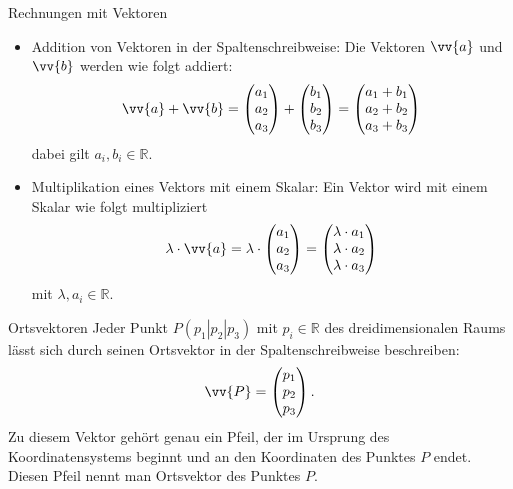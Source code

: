 \begin{bem}{Rechnungen mit Vektoren}{}
\begin{itemize}
    \item Addition von Vektoren in der Spaltenschreibweise: Die Vektoren $\vv{a}$ und $\vv{b}$ werden wie folgt addiert: $$\vv{a} + \vv{b} = \begin{pmatrix} a_1 \\ a_2 \\a_3 \end{pmatrix} + \begin{pmatrix} b_1 \\ b_2 \\b_3 \end{pmatrix} = \begin{pmatrix} a_1 + b_1 \\ a_2 + b_2 \\a_3 + b_3 \end{pmatrix}$$ dabei gilt $a_i, b_i \in \mathds{R}$.
    \item Multiplikation eines Vektors mit einem Skalar: Ein Vektor wird mit einem Skalar wie folgt multipliziert $$\lambda \cdot \vv{a} = \lambda \cdot \begin{pmatrix} a_1 \\ a_2 \\a_3 \end{pmatrix} = \begin{pmatrix} \lambda \cdot a_1 \\ \lambda \cdot a_2 \\\lambda \cdot a_3 \end{pmatrix}$$ mit $\lambda , a_i \in \mathds{R}$.
\end{itemize}
\end{bem}
\begin{satz}{Ortsvektoren}{}
Jeder Punkt $P(p_1|p_2|p_3)$ mit $p_i \in \mathds{R}$ des dreidimensionalen Raums lässt sich durch seinen Ortsvektor in der Spaltenschreibweise beschreiben:
$$\vv{P} = \begin{pmatrix} p_1 \\ p_2 \\p_3 \end{pmatrix}.$$ 
Zu diesem Vektor gehört genau ein Pfeil, der im Ursprung des Koordinatensystems beginnt und an den Koordinaten des Punktes $P$ endet.\\ 
Diesen Pfeil nennt man Ortsvektor des Punktes $P$.
\end{satz}
